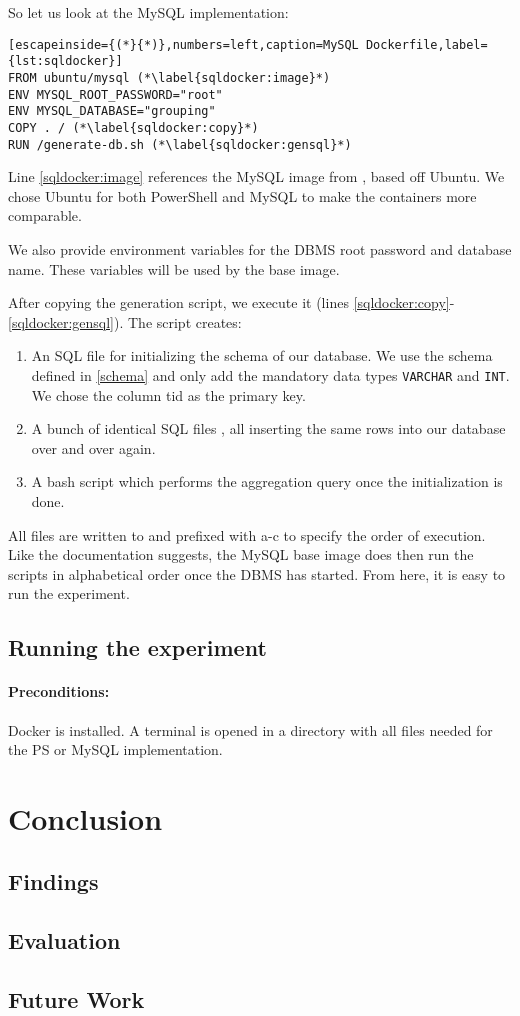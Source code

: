 So let us look at the MySQL implementation:

\begin{lstlisting}[escapeinside={(*}{*)},numbers=left,caption=MySQL Dockerfile,label={lst:sqldocker}]
FROM ubuntu/mysql (*\label{sqldocker:image}*)
ENV MYSQL_ROOT_PASSWORD="root"
ENV MYSQL_DATABASE="grouping"
COPY . / (*\label{sqldocker:copy}*)
RUN /generate-db.sh (*\label{sqldocker:gensql}*)
\end{lstlisting}
Line \ref{sqldocker:image} references the MySQL image from \cite{dockerMySQL},
based off Ubuntu. We chose Ubuntu for both PowerShell and MySQL to
make the containers more comparable.

We also provide environment variables for the \gls{DBMS} root password
and database name. These variables will be used by the base image.

After copying the generation script, we execute it
(lines \ref{sqldocker:copy}-\ref{sqldocker:gensql}).
The script creates:
\begin{enumerate}
    \item An SQL file  for initializing the schema of our database.
        We use the schema defined in \ref{schema} and only add
        the mandatory data types \verb+VARCHAR+ and \verb+INT+.
        We chose the column tid as the primary key.
    \item A bunch of identical SQL files ,
        all inserting the same
        rows into our database over and over again.
    \item A bash script  which performs the
        aggregation query once the initialization is done.
\end{enumerate}
All files are written to 
and prefixed with a-c to specify the order of execution.
Like the documentation suggests, the MySQL base image does then
run the scripts in alphabetical order once the \gls{DBMS}
has started. From here, it is easy to run the experiment.

\subsection{Running the experiment}

\paragraph{Preconditions:}
Docker is installed. A terminal is opened in a directory
with all files needed for the PS or MySQL implementation.

\section{Conclusion}

\subsection{Findings}

\subsection{Evaluation}

\subsection{Future Work}
